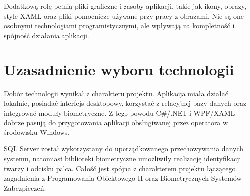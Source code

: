 \setlength{\tabcolsep}{6pt}

Dodatkową rolę pełnią pliki graficzne i zasoby aplikacji, takie jak ikony, obrazy, style XAML oraz pliki pomocnicze używane przy pracy z obrazami. Nie są one osobnymi technologiami programistycznymi, ale wpływają na kompletność i spójność działania aplikacji.

\section{Uzasadnienie wyboru technologii}

Dobór technologii wynikał z charakteru projektu. Aplikacja miała działać lokalnie, posiadać interfejs desktopowy, korzystać z relacyjnej bazy danych oraz integrować moduły biometryczne. Z tego powodu C\#/.NET i WPF/XAML dobrze pasują do przygotowania aplikacji obsługiwanej przez operatora w środowisku Windows.

SQL Server został wykorzystany do uporządkowanego przechowywania danych systemu, natomiast biblioteki biometryczne umożliwiły realizację identyfikacji twarzy i odcisku palca. Całość jest spójna z charakterem projektu łączącego zagadnienia z Programowania Obiektowego II oraz Biometrycznych Systemów Zabezpieczeń.

